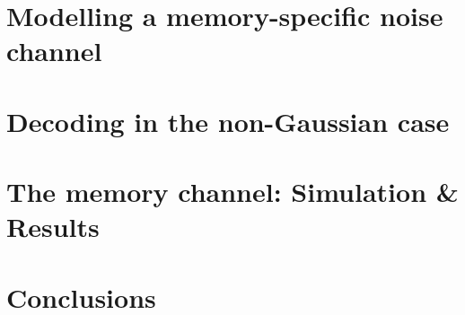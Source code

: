 \documentclass[11pt]{article}
\numberwithin{equation}{subsection}
\begin{document}
\section{Modelling a memory-specific noise channel}

\section{Decoding in the non-Gaussian case}

\section{The memory channel: Simulation \& Results}

\section{Conclusions}
\end{document}
